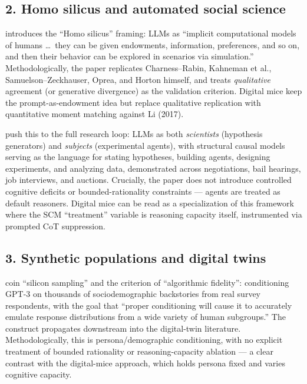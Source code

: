 \subsection*{2. Homo silicus and automated social science}

\citet{horton2023silicus} introduces the ``Homo silicus'' framing:
LLMs as ``implicit computational models of humans \dots\ they can be
given endowments, information, preferences, and so on, and then their
behavior can be explored in scenarios via simulation.'' Methodologically,
the paper replicates Charness--Rabin, Kahneman et al., Samuelson--Zeckhauser,
Oprea, and Horton himself, and treats \emph{qualitative} agreement (or
generative divergence) as the validation criterion. Digital mice keep
the prompt-as-endowment idea but replace qualitative replication with
quantitative moment matching against Li (2017).

\citet{manning2024automated} push this to the full research loop:
LLMs as both \emph{scientists} (hypothesis generators) and
\emph{subjects} (experimental agents), with structural causal models
serving as the language for stating hypotheses, building agents,
designing experiments, and analyzing data, demonstrated across
negotiations, bail hearings, job interviews, and auctions. Crucially,
the paper does not introduce controlled cognitive deficits or
bounded-rationality constraints --- agents are treated as default
reasoners. Digital mice can be read as a specialization of this
framework where the SCM ``treatment'' variable is reasoning capacity
itself, instrumented via prompted CoT suppression.

\subsection*{3. Synthetic populations and digital twins}

\citet{argyle2023silicon} coin ``silicon sampling'' and the criterion
of ``algorithmic fidelity'': conditioning GPT-3 on thousands of
sociodemographic backstories from real survey respondents, with the
goal that ``proper conditioning will cause it to accurately emulate
response distributions from a wide variety of human subgroups.'' The
construct propagates downstream into the digital-twin literature.
Methodologically, this is persona/demographic conditioning, with no
explicit treatment of bounded rationality or reasoning-capacity
ablation --- a clear contrast with the digital-mice approach, which
holds persona fixed and varies cognitive capacity.

